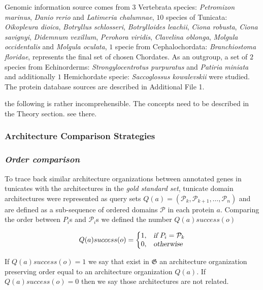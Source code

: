 \documentclass[11pt]{article}
\newcommand{\TODO}[1]{\begingroup\color{red}#1\endgroup}
\begin{document}
Genomic information source comes from $3$ Vertebrata species:
\textit{Petromizon marinus}, \textit{Danio rerio} and 
\textit{Latimeria chalumnae}, $10$ species of Tunicata: \textit{Oikopleura 
dioica}, \textit{Botryllus schlosseri}, \textit{Botrylloides 
leachii}, \textit{Ciona robusta}, \textit{Ciona savignyi}, \textit{Didemnum 
vexillum}, \textit{Perohora viridis}, \textit{Clavelina oblonga}, 
\textit{Molgula occidentalis} and \textit{Molgula oculata}, $1$ specie 
from Cephalochordata: \textit{Branchiostoma floridae}, represents the final set 
of chosen Chordates. As an outgroup, a set of $2$ species from Echinorderms: 
\textit{Strongylocentrotus purpuratus} and \textit{Patiria miniata} and 
additionally $1$ Hemichordate specie: \textit{Saccoglossus kowalevskii} were 
studied. The protein database sources are described in Additional File 1. 

\TODO{the following is rather incomprehensible. The concepts need to be
  described in the Theory section. see there.} 

\subsubsection*{Architecture Comparison Strategies}
\subsubsection*{\textit{\textbf{O}rder comparison}}

To trace back similar architecture organizations between annotated genes in 
tunicates with the architectures in the \textsl{gold standard set}, tunicate 
domain architectures were represented as query sets  $Q(a) = 
(\mathcal{P}_k,\mathcal{P}_{k+1},\ldots,\mathcal{P}_n)$ and are defined as a 
sub-sequence of ordered domains $\mathcal{P}$ in each protein $a$. Comparing 
the order between $P_i$s and $\mathcal{P}_i$s we defined the number 
$Q(a){success}(o)$

\begin{equation}
  Q(a){success(o)}=\left\{
  \begin{array}{@{}ll@{}}
    1, & \textsl{if}\ P_{i} = \mathcal{P}_{k} \\
    0, & \textsl{otherwise}
  \end{array}\right.
\end{equation} 

If $Q(a){success(o)} = 1$ we say that exist in $\boldsymbol{\mathfrak{G}}$ 
an architecture organization preserving order equal to an architecture 
organization $Q(a)$. If $Q(a){success(o)} = 0$ then we say those 
architectures are not related.
\end{document}
